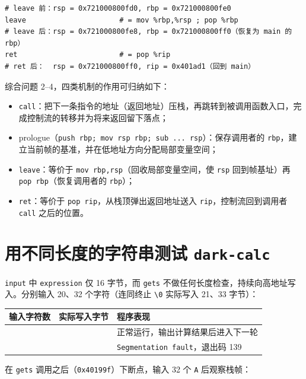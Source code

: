 \documentclass[11pt,a4paper]{article}
\begin{document}
\begin{lstlisting}
# leave 前：rsp = 0x721000800fd0, rbp = 0x721000800fe0
leave                      # = mov %rbp,%rsp ; pop %rbp
# leave 后：rsp = 0x721000800fe8, rbp = 0x721000800ff0（恢复为 main 的 rbp）
ret                        # = pop %rip
# ret 后：  rsp = 0x721000800ff0, rip = 0x401ad1（回到 main）
\end{lstlisting}

综合问题 2–4，四类机制的作用可归纳如下：

\begin{itemize}[leftmargin=2em]
  \item \texttt{call}：把下一条指令的地址（返回地址）压栈，再跳转到被调用函数入口，完成控制流的转移并为将来返回留下落点；
  \item prologue（\texttt{push rbp; mov rsp rbp; sub ... rsp}）：保存调用者的 \texttt{rbp}，建立当前帧的基准，并在低地址方向分配局部变量空间；
  \item \texttt{leave}：等价于 \texttt{mov rbp,rsp}（回收局部变量空间，使 \texttt{rsp} 回到帧基址）再 \texttt{pop rbp}（恢复调用者的 \texttt{rbp}）；
  \item \texttt{ret}：等价于 \texttt{pop rip}，从栈顶弹出返回地址送入 \texttt{rip}，控制流回到调用者 \texttt{call} 之后的位置。
\end{itemize}

\section{用不同长度的字符串测试 \texttt{dark-calc}}

\texttt{input} 中 \texttt{expression} 仅 16 字节，而 \texttt{gets} 不做任何长度检查，持续向高地址写入。分别输入 20、32 个字符（连同终止 \texttt{\textbackslash 0} 实际写入 21、33 字节）：

\begin{center}
\renewcommand{\arraystretch}{1.25}
\begin{tabular}{>{\ttfamily}l >{\ttfamily}l l}
\toprule
输入字符数 & 实际写入字节 & 程序表现 \\
\midrule
20 & 21 & 正常运行，输出计算结果后进入下一轮 \\
32 & 33 & \texttt{Segmentation fault}，退出码 139 \\
\bottomrule
\end{tabular}
\end{center}

在 \texttt{gets} 调用之后（\texttt{0x40199f}）下断点，输入 32 个 \texttt{A} 后观察栈帧：
\end{document}
